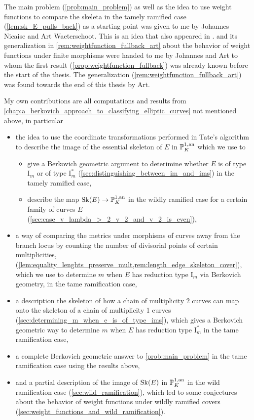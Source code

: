 The main problem (\cref{prob:main_problem}) as well as the idea to use weight functions to compare the skeleta in the tamely ramified case (\cref{lem:sk_E_pulls_back}) as a starting point was given to me by Johannes Nicaise and Art Waeterschoot.
This is an idea that also appeared in \cite[\S 6.1]{brownEssentialSkeletonProduct2019}.
 and its generalization in \cref{rem:weightfunction_fullback_art} about the behavior of weight functions under finite morphisms were handed to me by Johannes and Art to whom the first result (\cref{prop:weightfunction_fullback}) was already known before the start of the thesis. 
The generalization (\cref{rem:weightfunction_fullback_art}) was found towards the end of this thesis by Art.
\medskip

My own contributions are all computations and results from \cref{chap:a_berkovich_approach_to_classifying_elliptic_curves} not mentioned above, in particular
\begin{itemize}
	\item the idea to use the coordinate transformations performed in Tate's algorithm to describe the image of the essential skeleton of $E$ in $\mathbb{P}^{1, \text{an}}_K$ which we use to 
		\begin{itemize}
			\item give a Berkovich geometric argument to deterimine whether $E$ is of type $\mathrm I_m$ or of type $\mathrm I_m^*$ (\cref{sec:distinguishing_between_im_and_ims}) in the tamely ramified case,
			\item describe the map $\operatorname{Sk}(E) \to \mathbb{P}^{1, \text{an}}_K$ in the wildly ramified case for a certain family of curves $E$ (\cref{sec:case_v_lambda_>_2_v_2_and_v_2_is_even}),
		\end{itemize}
	\item a way of comparing the metrics under morphisms of curves away from the branch locus by counting the number of divisorial points of certain multiplicities, (\cref{lem:equality_lenghts_preserve_mult,rem:length_edge_skeleton_cover}), which we use to determine $m$ when $E$ has reduction type $\mathrm I_m$ via Berkovich geometry, in the tame ramification case, 

	\item a description the skeleton of how a chain of multiplicity 2 curves can map onto the skeleton of a chain of multiplicity 1 curves (\cref{sec:determining_m_when_e_is_of_type_ims}), which gives a Berkovich geometric way to determine $m$ when $E$ has reduction type $\mathrm I_m^*$ in the tame ramification case,

	\item a complete Berkovich geometric answer to \cref{prob:main_problem} in the tame ramification case using the results above,

	\item and a partial description of the image of $\operatorname{Sk}(E)$ in $\mathbb{P}^{1, \text{an}}_K$ in the wild ramification case (\cref{sec:wild_ramification}), which led to some conjectures about the behavior of weight functions under wildly ramified covers (\cref{sec:weight_functions_and_wild_ramification}). 
\end{itemize}


